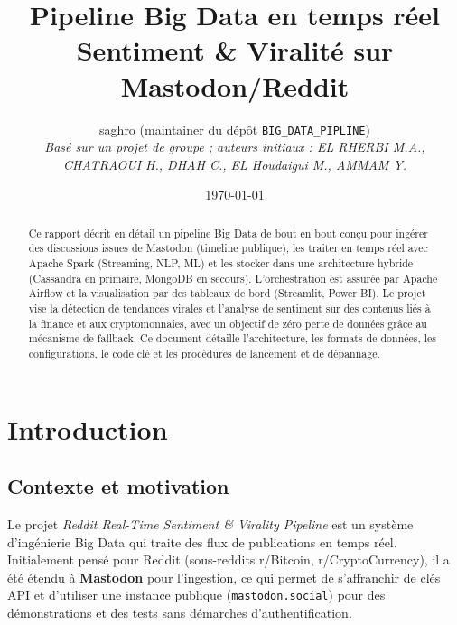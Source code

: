 \documentclass[12pt,a4paper]{article}
\title{\textbf{Pipeline Big Data en temps réel\\Sentiment \& Viralité sur Mastodon/Reddit}}
\author{
  saghro (maintainer du dépôt \texttt{BIG\_DATA\_PIPLINE})\\
  \small\textit{Basé sur un projet de groupe ; auteurs initiaux : EL RHERBI M.A., CHATRAOUI H., DHAH C., EL Houdaigui M., AMMAM Y.}
}
\date{\today}
\begin{document}
\maketitle
\thispagestyle{empty}
\newpage
\setcounter{page}{1}

\begin{abstract}
Ce rapport décrit en détail un pipeline Big Data de bout en bout conçu pour ingérer des discussions issues de Mastodon (timeline publique), les traiter en temps réel avec Apache Spark (Streaming, NLP, ML) et les stocker dans une architecture hybride (Cassandra en primaire, MongoDB en secours). L'orchestration est assurée par Apache Airflow et la visualisation par des tableaux de bord (Streamlit, Power BI). Le projet vise la détection de tendances virales et l'analyse de sentiment sur des contenus liés à la finance et aux cryptomonnaies, avec un objectif de zéro perte de données grâce au mécanisme de fallback. Ce document détaille l'architecture, les formats de données, les configurations, le code clé et les procédures de lancement et de dépannage.
\end{abstract}

\tableofcontents
\newpage

\section{Introduction}

\subsection{Contexte et motivation}

Le projet \emph{Reddit Real-Time Sentiment \& Virality Pipeline} est un système d'ingénierie Big Data qui traite des flux de publications en temps réel. Initialement pensé pour Reddit (sous-reddits r/Bitcoin, r/CryptoCurrency), il a été étendu à \textbf{Mastodon} pour l'ingestion, ce qui permet de s'affranchir de clés API et d'utiliser une instance publique (\texttt{mastodon.social}) pour des démonstrations et des tests sans démarches d'authentification.
\end{document}
